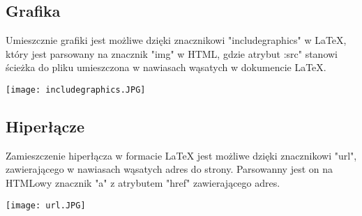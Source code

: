 \subsection{Grafika}

Umieszcznie grafiki jest możliwe dzięki znacznikowi "includegraphics" w LaTeX, który jest parsowany na znacznik "img" w HTML, gdzie 
atrybut :src" stanowi ścieżka do pliku umieszczona w nawiasach wąsatych w dokumencie LaTeX.

\texttt{[image: includegraphics.JPG]}

\subsection{Hiperłącze}

Zamieszczenie hiperłącza w formacie LaTeX jest możliwe dzięki znacznikowi "url", zawierającego w nawiasach wąsatych adres do strony.
Parsowanny jest on na HTMLowy znacznik "a" z atrybutem "href" zawierającego adres.

\texttt{[image: url.JPG]}